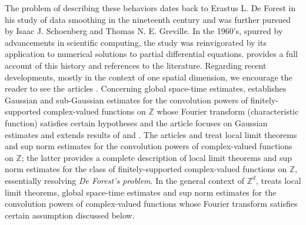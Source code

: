 \documentclass[11pt, letter]{book}
\begin{document}
\noindent The problem of describing these behaviors dates back to Erastus L. De Forest in his study of data smoothing in the nineteenth century and was further pursued by Isaac J. Schoenberg and Thomas N. E.  Greville. In the 1960's, spurred by advancements in scientific computing, the study was reinvigorated by its application to numerical solutions to partial differential equations. \cite{diaconis_convolution_2014} provides a full account of this history and references to the literature. Regarding recent developments, mostly in the context of one spatial dimension, we encourage the reader to see the articles \cite{diaconis_convolution_2014,randles_convolution_2015, coulombel2020generalized, randles_convolution_2017}. Concerning global space-time estimates, \cite{diaconis_convolution_2014} establishes Gaussian and sub-Gaussian estimates for the convolution powers of finitely-supported complex-valued functions on $\mathbb{Z}$ whose Fourier transform (characteristic function) satisfies certain hypotheses and the article \cite{coulombel2020generalized} focuses on Gaussian estimates and extends results of \cite{diaconis_convolution_2014} and \cite{randles_convolution_2017}. The articles \cite{diaconis_convolution_2014} and \cite{randles_convolution_2015} treat local limit theorems and sup norm estimates for the convolution powers of complex-valued functions on $\mathbb{Z}$; the latter provides a complete description of local limit theorems and sup norm estimates for the class of finitely-supported complex-valued functions on $\mathbb{Z}$, essentially resolving \textit{De Forest's problem}. In the general context of $\mathbb{Z}^d$, \cite{randles_convolution_2017} treats local limit theorems, global space-time estimates and sup norm estimates for the convolution powers of complex-valued functions whose Fourier transform satisfies certain assumption discussed below.  \\
\end{document}
